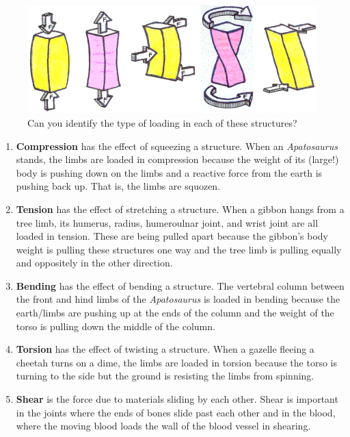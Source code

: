 \documentclass[]{book}
\providecommand{\tightlist}{%
  \setlength{\itemsep}{0pt}\setlength{\parskip}{0pt}}
\begin{document}
\begin{figure}
\includegraphics[width=7.11in]{images/materials_chapter/loading} \caption{Can you identify the type of loading in each of these structures?}\label{fig:unnamed-chunk-6}
\end{figure}

\begin{enumerate}
\def\labelenumi{\arabic{enumi}.}
\tightlist
\item
  \textbf{Compression} has the effect of squeezing a structure. When an
  \emph{Apatosaurus} stands, the limbs are loaded in compression because
  the weight of its (large!) body is pushing down on the limbs and a
  reactive force from the earth is pushing back up. That is, the limbs
  are squozen.
\item
  \textbf{Tension} has the effect of stretching a structure. When a
  gibbon hangs from a tree limb, its humerus, radius, humeroulnar joint,
  and wrist joint are all loaded in tension. These are being pulled
  apart because the gibbon's body weight is pulling these structures one
  way and the tree limb is pulling equally and oppositely in the other
  direction.
\item
  \textbf{Bending} has the effect of bending a structure. The vertebral
  column between the front and hind limbs of the \emph{Apatosaurus} is
  loaded in bending because the earth/limbs are pushing up at the ends
  of the column and the weight of the torso is pulling down the middle
  of the column.
\item
  \textbf{Torsion} has the effect of twisting a structure. When a
  gazelle fleeing a cheetah turns on a dime, the limbs are loaded in
  torsion because the torso is turning to the side but the ground is
  resisting the limbs from spinning.
\item
  \textbf{Shear} is the force due to materials sliding by each other.
  Shear is important in the joints where the ends of bones slide past
  each other and in the blood, where the moving blood loads the wall of
  the blood vessel in shearing.
\end{enumerate}
\end{document}
